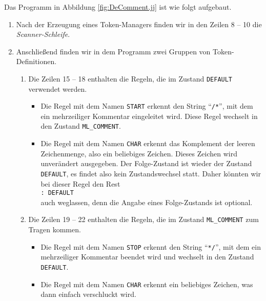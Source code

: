 \noindent
Das Programm in Abbildung \ref{fig:DeComment.jj} ist wie folgt aufgebaut.
\begin{enumerate}
\item Nach der Erzeugung eines Token-Managers finden wir in den Zeilen 8 -- 10
      die \emph{Scanner-Schleife}.
\item Anschlie{\ss}end finden wir in dem Programm zwei Gruppen von Token-Definitionen.
      \begin{enumerate}
      \item Die Zeilen 15 -- 18 enthalten die Regeln, die im Zustand \texttt{DEFAULT}
            verwendet werden.
            \begin{itemize}
            \item Die Regel mit dem Namen \texttt{START} erkennt den String 
                  ``\texttt{/*}'', mit dem ein mehrzeiliger Kommentar eingeleitet wird.
                  Diese Regel wechselt in den Zustand \texttt{ML\_COMMENT}.
            \item Die Regel mit dem Namen \texttt{CHAR} erkennt das Komplement
                  der leeren Zeichenmenge, also ein beliebiges Zeichen.
                  Dieses Zeichen wird unver\"andert ausgegeben.  Der Folge-Zustand
                  ist wieder der Zustand \texttt{DEFAULT}, es findet also kein
                  Zustandswechsel statt.  Daher k\"onnten wir bei dieser Regel 
                  den Rest 
                  \\[0.2cm]
                  \hspace*{1.3cm}
                  \texttt{: DEFAULT}
                  \\[0.2cm]
                  auch weglassen, denn die Angabe eines Folge-Zustands ist optional.
            \end{itemize}
      \item Die Zeilen 19 -- 22 enthalten die Regeln, die im Zustand \texttt{ML\_COMMENT}
            zum Tragen kommen.
            \begin{itemize}
            \item Die Regel mit dem Namen \texttt{STOP} erkennt den String
                  ``\texttt{*/}'', mit dem ein mehrzeiliger Kommentar beendet wird
                  und wechselt in den Zustand \texttt{DEFAULT}.
            \item Die Regel mit dem Namen \texttt{CHAR} erkennt ein beliebiges
                  Zeichen, was dann einfach verschluckt wird.
            \end{itemize}
      \end{enumerate}
\end{enumerate}
